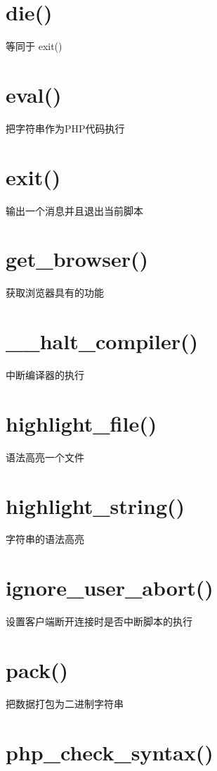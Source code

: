 \section{die()}

等同于 exit()

\section{eval()}

把字符串作为PHP代码执行

\section{exit()}

输出一个消息并且退出当前脚本

\section{get\_browser()}

获取浏览器具有的功能

\section{\_\_halt\_compiler()}

中断编译器的执行

\section{highlight\_file()}

语法高亮一个文件

\section{highlight\_string()}

字符串的语法高亮

\section{ignore\_user\_abort()}

设置客户端断开连接时是否中断脚本的执行

\section{pack()}

把数据打包为二进制字符串

\section{php\_check\_syntax()}

